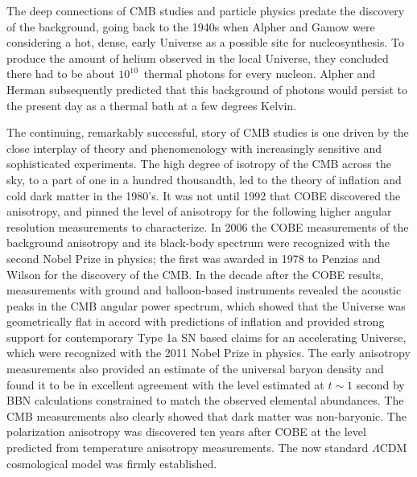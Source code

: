 The deep connections of CMB studies and particle physics predate the discovery of the background, going back to the 1940s when Alpher and Gamow were considering a hot, dense, early Universe as a possible site for nucleosynthesis. To produce the
amount of helium observed in the local Universe, they concluded there
had to be about $10^{10}$\ thermal photons for every nucleon. Alpher and Herman subsequently predicted that this background of photons would persist to the present day as a thermal bath at a few degrees Kelvin.

The continuing, remarkably successful, story of CMB studies is one driven by the close interplay of theory and phenomenology with increasingly sensitive and sophisticated experiments. The high degree of isotropy of the CMB across the sky, to a part of one in a hundred thousandth, led to the theory of inflation and cold dark matter in the 1980's. It was not until 1992 that COBE discovered the anisotropy, and pinned the level of anisotropy for the following higher angular resolution measurements to characterize. In 2006 the COBE measurements of the background anisotropy and its black-body spectrum were recognized with the second Nobel Prize in physics; the first was awarded in 1978 to Penzias and Wilson for the discovery of the CMB.  In the decade after the COBE results, measurements with ground and balloon-based instruments revealed the acoustic peaks in the CMB angular power spectrum, which showed that the Universe was geometrically flat in accord with predictions of inflation and provided strong support for contemporary Type 1a SN based claims for an accelerating Universe, which were recognized with the 2011 Nobel Prize in physics. The early anisotropy measurements also provided an estimate of the universal baryon density and found it to be in excellent agreement with the level estimated at $t \sim 1$ second by BBN calculations constrained to match the observed elemental abundances. The CMB measurements also clearly showed that dark matter was non-baryonic. The polarization anisotropy was discovered ten years after COBE at the level predicted from temperature anisotropy measurements. The now standard $\Lambda$CDM cosmological model was firmly established.

